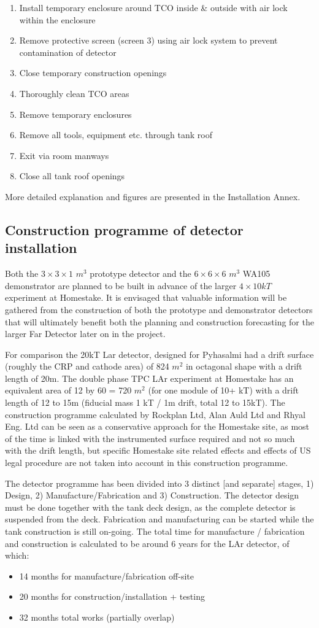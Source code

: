 \begin{enumerate}
\item{Install temporary enclosure around TCO inside \& outside with air lock within the enclosure}
\item{ Remove protective screen (screen 3) using air lock system to prevent contamination of detector}
\item{Close temporary construction openings}
\item{Thoroughly clean TCO areas}
\item{Remove temporary enclosures}
\item{Remove all tools, equipment etc. through tank roof}
\item{Exit via room manways}
\item{Close all tank roof openings}
\end{enumerate}

More detailed explanation and figures are presented in the Installation Annex.

\subsection{Construction programme of detector installation}

Both the $3\times3\times1$ $m^3$ prototype detector and the $6\times 6\times 6$ $m^3$  WA105 demonstrator are planned to be built in advance of the larger $4\times 10kT$ experiment at Homestake.  It is envisaged that valuable information will be gathered from the construction of both the prototype and demonstrator detectors that will ultimately benefit both the planning and construction forecasting for the larger Far Detector later on in the project.

For comparison the 20kT Lar detector, designed for Pyhasalmi had a drift surface (roughly the CRP and cathode area) of 824 $m^2$ in octagonal shape with a drift length of 20m. The double phase TPC LAr experiment at Homestake has an equivalent area of 12 by 60 = 720 $m^2$ (for one module of 10+ kT) with a drift length of 12 to 15m (fiducial mass 1 kT / 1m drift, total 12 to 15kT). The construction programme calculated by Rockplan Ltd, Alan Auld Ltd and Rhyal Eng. Ltd can be seen as a conservative approach for the Homestake site, as most of the time is linked with the instrumented surface required and not so much with the drift length, but specific Homestake site related effects and effects of US legal procedure are not taken into account in this construction programme.

The detector programme has been divided into 3 distinct [and separate] stages, 1) Design, 2) Manufacture/Fabrication and 3) Construction.  The detector design must be done together with the tank deck design, as the complete detector is suspended from the deck.  Fabrication and manufacturing can be started while the tank construction is still on-going.  The total time for manufacture / fabrication and construction is calculated to be around 6 years for the LAr detector, of which:

\begin{itemize}
\item{14 months		for manufacture/fabrication off-site}
\item{20 months		for construction/installation + testing}
\item{32 months		total works (partially overlap)}
\end{itemize}


